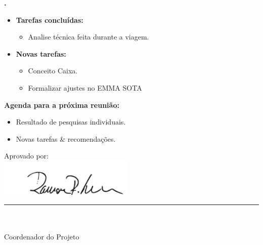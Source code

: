 			
   \textbf{\gabriel.} 
	\begin{itemize}
		\item \textbf{Tarefas concluídas:}
			\begin{itemize}    
				\item Analise técnica feita durante a viagem.
			\end{itemize}
		
		\item \textbf{Novas tarefas:}
			\begin{itemize} 
			    \item Conceito Caixa.
				\item Formalizar ajustes no EMMA SOTA
			\end{itemize}
	\end{itemize}

			



\textbf{Agenda para a próxima reunião:}
  \begin{itemize}
    \item Resultado de pesquisas individuais.
    \item Novas tarefas \& recomendações.
  \end{itemize}


\vspace{5mm}%
\parbox[t]{70mm}{
  Aprovado por: \\[5mm]
  \centering
  \includegraphics[width=65mm]{figs/logo/assinatura-ramon.png} \\[-4mm]
  \rule[2mm]{70mm}{0.1mm} \\
  \ramon \\[1mm]
  Coordenador do Projeto \\
}

\fim